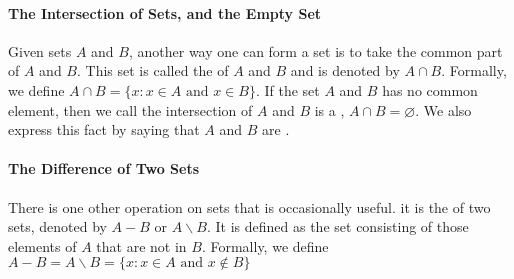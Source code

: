 \paragraph{The Intersection of Sets, and the Empty Set} Given sets $A$ and $B$, another way one can form a set is to take the common part of $A$ and $B$. This set is called the \textbf{} of $A$ and $B$ and is denoted by $A \cap B$. Formally, we define $A \cap B = \{x: x\in A \text{ and } x \in B\}$. If the set $A$ and $B$ has no common element, then we call the intersection of $A$ and $B$ is a \textbf{}, $A \cap B = \varnothing$. We also express this fact by saying that $A$ and $B$ are \textbf{}.

\paragraph{The Difference of Two Sets} There is one other operation on sets that is occasionally useful. it is the \textbf{} of two sets, denoted by $A - B$ or $A \backslash B$. It is defined as the set consisting of those elements of $A$ that are not in $B$. Formally, we define $A - B = A \backslash B = \{x: x\in A \text{ and } x \not\in B\}$

\def\firstcircle{(0,0) circle (1.1cm)}
\def\secondcircle{(0:1.5cm) circle (1.1cm)}



\setlength{\parskip}{5mm}

